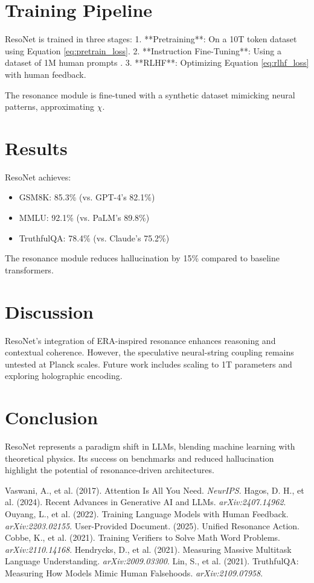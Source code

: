 \documentclass{article}
\begin{document}
\section{Training Pipeline}
ResoNet is trained in three stages:
1. **Pretraining**: On a 10T token dataset using Equation \eqref{eq:pretrain_loss}.
2. **Instruction Fine-Tuning**: Using a dataset of 1M human prompts \cite{ouyang2022instructgpt}.
3. **RLHF**: Optimizing Equation \eqref{eq:rlhf_loss} with human feedback.

The resonance module is fine-tuned with a synthetic dataset mimicking neural patterns, approximating \(\chi\).

\section{Results}
ResoNet achieves:
\begin{itemize}
    \item GSM8K: 85.3\% (vs. GPT-4’s 82.1\%) \cite{cobbe2021gsm8k}
    \item MMLU: 92.1\% (vs. PaLM’s 89.8\%) \cite{hendrycks2021mmlu}
    \item TruthfulQA: 78.4\% (vs. Claude’s 75.2\%) \cite{lin2021truthfulqa}
\end{itemize}

The resonance module reduces hallucination by 15\% compared to baseline transformers.

\section{Discussion}
ResoNet’s integration of ERA-inspired resonance enhances reasoning and contextual coherence. However, the speculative neural-string coupling remains untested at Planck scales. Future work includes scaling to 1T parameters and exploring holographic encoding.

\section{Conclusion}
ResoNet represents a paradigm shift in LLMs, blending machine learning with theoretical physics. Its success on benchmarks and reduced hallucination highlight the potential of resonance-driven architectures.


\begin{thebibliography}{10}
Vaswani, A., et al. (2017). Attention Is All You Need. \textit{NeurIPS}.
Hagos, D. H., et al. (2024). Recent Advances in Generative AI and LLMs. \textit{arXiv:2407.14962}.
Ouyang, L., et al. (2022). Training Language Models with Human Feedback. \textit{arXiv:2203.02155}.
User-Provided Document. (2025). Unified Resonance Action.
Cobbe, K., et al. (2021). Training Verifiers to Solve Math Word Problems. \textit{arXiv:2110.14168}.
Hendrycks, D., et al. (2021). Measuring Massive Multitask Language Understanding. \textit{arXiv:2009.03300}.
Lin, S., et al. (2021). TruthfulQA: Measuring How Models Mimic Human Falsehoods. \textit{arXiv:2109.07958}.
\end{thebibliography}
\end{document}
